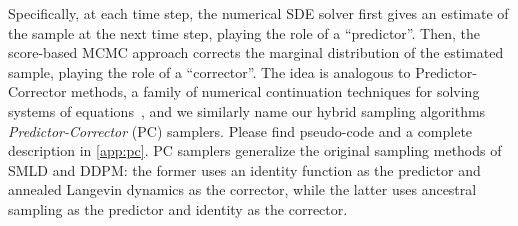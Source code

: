 Specifically, at each time step, the numerical SDE solver first gives an estimate of the sample at the next time step, playing the role of a ``predictor''. Then, the score-based MCMC approach corrects the 
marginal distribution of the estimated sample, playing the role of a ``corrector''. The idea is analogous to Predictor-Corrector methods, a family of numerical continuation techniques for solving systems of equations~\citep{allgower2012numerical}, and we similarly name our hybrid sampling algorithms \emph{Predictor-Corrector} (PC) samplers. Please find pseudo-code and a complete description in \cref{app:pc}. PC samplers generalize the original sampling methods of SMLD and DDPM: the former uses an identity function as the predictor and annealed Langevin dynamics as the corrector, while the latter uses ancestral sampling as the predictor and identity as the corrector. %

